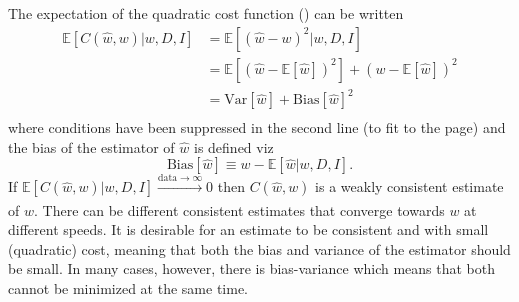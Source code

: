 \begin{theorem}
	\label{theorem:MSE}
	The expectation of the quadratic cost function () can be written
	\begin{equation}
		\begin{split}
			\mathbb{E}[C(\hat{w}, w)|w,D,I] &= \mathbb{E}[(\hat{w}-w)^2|w,D,I]\\ 
			&= \mathbb{E}[(\hat{w}-\mathbb{E}[\hat{w}])^2]+(w-\mathbb{E}[\hat{w}])^2\\
			&=\text{Var}[\hat{w}]+\text{Bias}[\hat{w}]^2\\
		\end{split}
		\label{eq:MSE}
	\end{equation}
	where conditions have been suppressed in the second line (to fit to the page) and the bias of the estimator of $\hat{w}$ is defined viz
	\begin{equation}
		\text{Bias}[\hat{w}]\equiv w-\mathbb{E}[\hat{w}|w,D,I].
	\end{equation}
	If $\mathbb{E}[C(\hat{w}, w)|w,D,I]\xrightarrow[]{\text{data}\rightarrow\infty} 0$ then $C(\hat{w}, w)$ is a weakly consistent estimate of $w$. There can be different consistent estimates that converge towards $w$ at different speeds. It is desirable for an estimate to be consistent and with small (quadratic) cost, meaning that both the bias and variance of the estimator should be small. In many cases, however, there is bias-variance which means that both cannot be minimized at the same time. 
\end{theorem}

